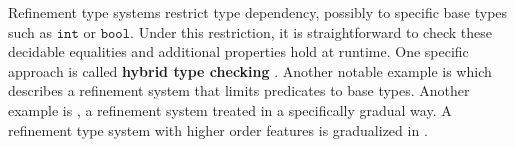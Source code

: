 Refinement type systems restrict type dependency, possibly to specific base types such as $\mathtt{int}$ or $\mathtt{bool}$.
Under this restriction, it is straightforward to check these decidable equalities and additional properties hold at runtime.
One specific approach is called \textbf{hybrid type checking} \cite{10.1145/1111037.1111059}.
Another notable example is \cite{10.1007/1-4020-8141-3_34} which describes a refinement system that limits predicates to base types.
Another example is \cite{10.1145/3093333.3009856}, a refinement system treated in a specifically gradual way.
A refinement type system with higher order features is gradualized in \cite{c4be73a0daf74c9aa4d13483a2c4dd0e}.
 
 
